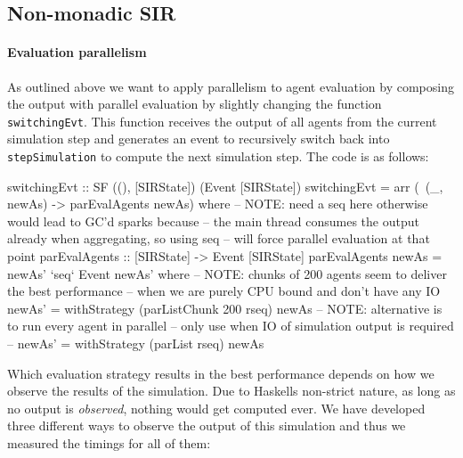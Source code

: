 \subsection{Non-monadic SIR}
\label{parallel_nonmonadic_sir}

\paragraph{Evaluation parallelism}
As outlined above we want to apply parallelism to agent evaluation by composing the output with parallel evaluation by slightly changing the function \texttt{switchingEvt}. This function receives the output of all agents from the current simulation step and generates an event to recursively switch back into \texttt{stepSimulation} to compute the next simulation step. The code is as follows:

\begin{HaskellCode}
switchingEvt :: SF ((), [SIRState]) (Event [SIRState])
switchingEvt = arr (\ (_, newAs) -> parEvalAgents newAs)
  where
    -- NOTE: need a seq here otherwise would lead to GC'd sparks because
    -- the main thread consumes the output already when aggregating, so using seq 
    -- will force parallel evaluation at that point 
    parEvalAgents :: [SIRState] -> Event [SIRState]
    parEvalAgents newAs = newAs' `seq` Event newAs' 
      where
        -- NOTE: chunks of 200 agents seem to deliver the best performance
        -- when we are purely CPU bound and don't have any IO
        newAs' = withStrategy (parListChunk 200 rseq) newAs
        -- NOTE: alternative is to run every agent in parallel
        -- only use when IO of simulation output is required
        -- newAs' = withStrategy (parList rseq) newAs
\end{HaskellCode}

Which evaluation strategy results in the best performance depends on how we observe the results of the simulation. Due to Haskells non-strict nature, as long as no output is \textit{observed}, nothing would get computed ever. We have developed three different ways to observe the output of this simulation and thus we measured the timings for all of them:

